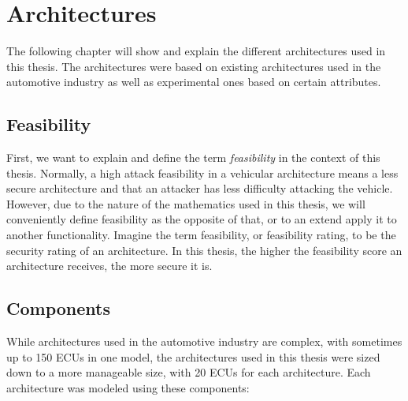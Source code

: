 \chapter{Architectures}
\label{chp:arch}

The following chapter will show and explain the different architectures used in this thesis.
The architectures were based on existing architectures used in the automotive industry as well as experimental ones based on certain attributes.

\section{Feasibility}
\label{def:feasibility}

First, we want to explain and define the term \textit{feasibility} in the context of this thesis.
Normally, a high attack feasibility in a vehicular architecture means a less secure architecture and that an attacker has less difficulty attacking the vehicle.
However, due to the nature of the mathematics used in this thesis, we will conveniently define feasibility as the opposite of that, or to an extend apply it to another functionality.
Imagine the term feasibility, or feasibility rating, to be the security rating of an architecture.
In this thesis, the higher the feasibility score an architecture receives, the more secure it is. 

\section{Components}
\label{sec:components}

While architectures used in the automotive industry are complex, with sometimes up to 150 ECUs in one model, 
the architectures used in this thesis were sized down to a more manageable size, with 20 ECUs for each architecture.
Each architecture was modeled using these components:

